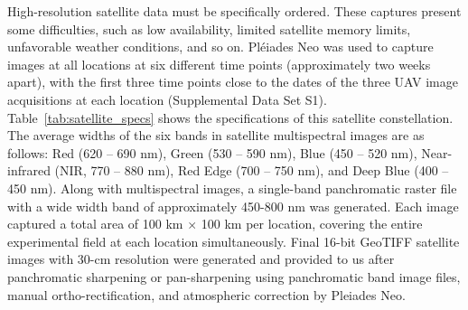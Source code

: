 \documentclass[12pt,twoside]{gsag3jnl}
\begin{document}
High-resolution satellite data must be specifically ordered. These captures present some difficulties, such as low availability, limited satellite memory limits, unfavorable weather conditions, and so on. Pléiades Neo was used to capture images at all locations at six different time points (approximately two weeks apart), with the first three time points close to the dates of the three UAV image acquisitions at each location (Supplemental Data Set S1). Table~\ref{tab:satellite_specs} shows the specifications of this satellite constellation. The average widths of the six bands in satellite multispectral images are as follows: Red (620 -- 690 nm), Green (530 -- 590 nm), Blue (450 -- 520 nm), Near-infrared (NIR, 770 -- 880 nm), Red Edge (700 -- 750 nm), and Deep Blue (400 -- 450 nm). Along with multispectral images, a single-band panchromatic raster file with a wide width band of approximately 450-800 nm was generated. Each image captured a total area of 100 km $\times$ 100 km per location, covering the entire experimental field at each location simultaneously. Final 16-bit GeoTIFF satellite images with 30-cm resolution were generated and provided to us after panchromatic sharpening or pan-sharpening using panchromatic band image files, manual ortho-rectification, and atmospheric correction by Pleiades Neo.
\end{document}
